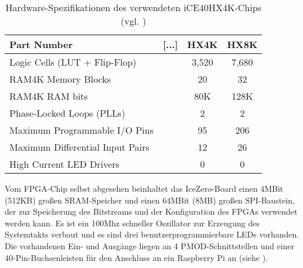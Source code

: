 \begin{table}[H]
\centering
\begin{tabular}{|l|l|c|c|}
\hline
\rowcolor[HTML]{EFEFEF} 
\textbf{Part Number}             & {[}...{]} & \multicolumn{1}{l|}{\cellcolor[HTML]{EFEFEF}\textbf{HX4K}} & \multicolumn{1}{l|}{\cellcolor[HTML]{EFEFEF}\textbf{HX8K}} \\ \hline
Logic Cells (LUT + Flip-Flop)    &           & 3,520                                                      & 7,680                                                      \\ \hline
RAM4K Memory Blocks              &           & 20                                                         & 32                                                         \\ \hline
RAM4K RAM bits                   &           & 80K                                                        & 128K                                                       \\ \hline
Phase-Locked Loops (PLLs)        &           & 2                                                          & 2                                                          \\ \hline
Maximum Programmable I/O Pins    &           & 95                                                         & 206                                                        \\ \hline
Maximum Differential Input Pairs &           & 12                                                         & 26                                                         \\ \hline
High Current LED Drivers         &           & 0                                                          & 0                                                          \\ \hline
\end{tabular}
	\caption{Hardware-Spezifikationen des verwendeten iCE40HX4K-Chips (vgl. \cite{doc:datasheet})}
\label{tbl:ice40_specs}
\end{table}

Vom FPGA-Chip selbst abgesehen beinhaltet das IceZero-Board einen 4MBit (512KB) großen SRAM-Speicher und einen 64MBit (8MB) großen SPI-Baustein, der zur Speicherung des Bitstreams und der Konfiguration des FPGAs verwendet werden kann.
Es ist ein 100Mhz schneller Oszillator zur Erzeugung des Systemtakts verbaut und es sind drei benutzerprogrammierbare LEDs vorhanden.
Die vorhandenen Ein- und Ausgänge liegen an 4 \gls{PMOD}-Schnittstellen und einer 40-Pin-Buchsenleisten für den Anschluss an ein Raspberry Pi an (siehe \cite{web:trenz_icezero}). 


